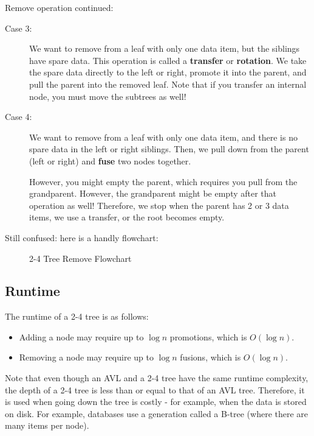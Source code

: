 
Remove operation continued:

\begin{description}
	\item[Case 3:] We want to remove from a leaf with only one data item, but the siblings have spare data. This operation is called a \textbf{transfer} or \textbf{rotation}. We take the spare data directly to the left or right, promote it into the parent, and pull the parent into the removed leaf. Note that if you transfer an internal node, you must move the subtrees as well!
	\item[Case 4:] We want to remove from a leaf with only one data item, and there is no spare data in the left or right siblings. Then, we pull down from the parent (left or right) and \textbf{fuse} two nodes together. \par
		However, you might empty the parent, which requires you pull from the grandparent. However, the grandparent might be empty after that operation as well! Therefore, we stop when the parent has 2 or 3 data items, we use a transfer, or the root becomes empty.
\end{description}

Still confused: here is a handly flowchart:
\begin{figure}[ht]
    \centering
    \caption{2-4 Tree Remove Flowchart}
    \label{fig:2-4-tree-remove-flowchart}
\end{figure}

\subsection{Runtime}
The runtime of a 2-4 tree is as follows:
\begin{itemize}
	\item Adding a node may require up to \( \log n \) promotions, which is \( O(\log n) \).
	\item Removing a node may require up to \( \log n \) fusions, which is \( O(\log n) \).
\end{itemize}

\begin{note}
	Note that even though an AVL and a 2-4 tree have the same runtime complexity, the depth of a 2-4 tree is less than or equal to that of an AVL tree. Therefore, it is used when going down the tree is costly - for example, when the data is stored on disk. For example, databases use a generation called a B-tree (where there are many items per node).
\end{note}

